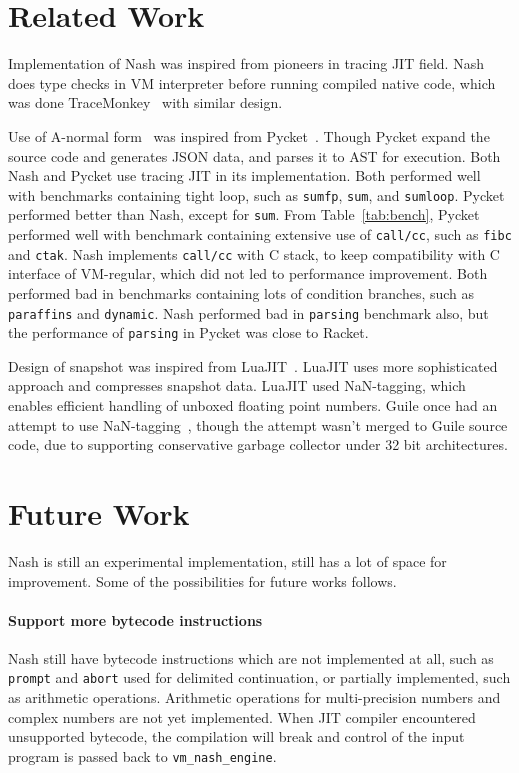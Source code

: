 \documentclass[preprint, 10pt]{sigplanconf}
\begin{document}
\section{Related Work}
\label{sec:related}
Implementation of Nash was inspired from pioneers in tracing JIT field. Nash
does type checks in VM interpreter before running compiled native code, which
was done TraceMonkey~\cite{gal2009trace} with similar design.

Use of A-normal form~\cite{flanagan1993essence} was inspired from
Pycket~\cite{bauman2015pycket}. Though Pycket expand the source code and
generates JSON data, and parses it to AST for execution.  Both Nash and Pycket
use tracing JIT in its implementation. Both performed well with benchmarks
containing tight loop, such as \texttt{sumfp}, \texttt{sum}, and
\texttt{sumloop}. Pycket performed better than Nash, except for
\texttt{sum}. From Table~\hyperref[tab:bench]{\ref{tab:bench}}, Pycket performed
well with benchmark containing extensive use of \texttt{call/cc}, such as
\texttt{fibc} and \texttt{ctak}. Nash implements \texttt{call/cc} with C stack,
to keep compatibility with C interface of VM-regular, which did not led to
performance improvement. Both performed bad in benchmarks containing lots of
condition branches, such as \texttt{paraffins} and \texttt{dynamic}. Nash
performed bad in \texttt{parsing} benchmark also, but the performance of
\texttt{parsing} in Pycket was close to Racket.

Design of snapshot was inspired from LuaJIT~\cite{pall2009ip}. LuaJIT uses more
sophisticated approach and compresses snapshot data. LuaJIT used NaN-tagging,
which enables efficient handling of unboxed floating point numbers. Guile once
had an attempt to use NaN-tagging~\cite{wingo2011value}, though the attempt
wasn't merged to Guile source code, due to supporting conservative garbage
collector under 32 bit architectures.

\section{Future Work}
\label{sec:future}

Nash is still an experimental implementation, still has a lot of space for
improvement. Some of the possibilities for future works follows.

\paragraph{Support more bytecode instructions} Nash still have bytecode
instructions which are not implemented at all, such as \texttt{prompt} and
\texttt{abort} used for delimited continuation, or partially implemented, such
as arithmetic operations. Arithmetic operations for multi-precision numbers and
complex numbers are not yet implemented. When JIT compiler encountered
unsupported bytecode, the compilation will break and control of the input
program is passed back to \texttt{vm\_nash\_engine}.
\end{document}
